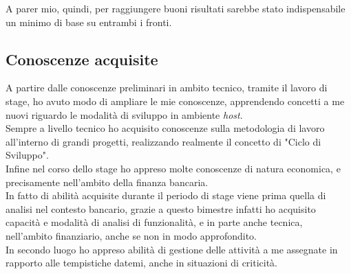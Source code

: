A parer mio, quindi, per raggiungere buoni risultati sarebbe stato indispensabile un minimo di base su entrambi i fronti.

\newpage

\subsection{Conoscenze acquisite}

A partire dalle conoscenze preliminari in ambito tecnico, tramite il lavoro di stage, ho avuto modo di ampliare le mie conoscenze, apprendendo concetti a me nuovi riguardo le modalità di sviluppo in ambiente \textit{host}.\\

Sempre a livello tecnico ho acquisito conoscenze sulla metodologia di lavoro all'interno di grandi progetti, realizzando realmente il concetto di "Ciclo di Sviluppo".\\

Infine nel corso dello stage ho appreso molte conoscenze di natura economica, e precisamente nell'ambito della finanza bancaria.\\


In fatto di abilità acquisite durante il periodo di stage viene prima quella di analisi nel contesto bancario, grazie a questo bimestre infatti ho acquisito capacità e modalità di analisi di funzionalità, e in parte anche tecnica, nell'ambito finanziario, anche se non in modo approfondito.\\

In secondo luogo ho appreso abilità di gestione delle attività a me assegnate in rapporto alle tempistiche datemi, anche in situazioni di criticità.\\

